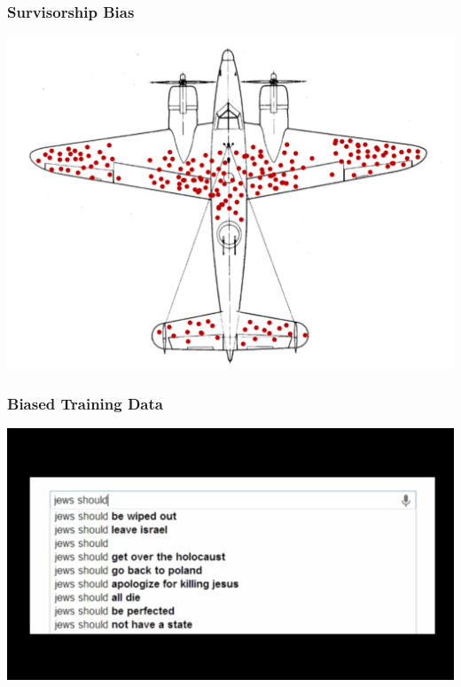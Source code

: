 \documentclass{beamer}
\begin{document}
\begin{frame}
	\frametitle{Survisorship Bias}
	
		\includegraphics[scale=.25]{figures/airplane.png}\\	

	
\end{frame}

\begin{frame}
	\frametitle{Biased Training Data}
		
		\begin{center}
			
			\includegraphics[scale=.7]{figures/biased_google.png}
		\end{center}
		
		
		
		
		
	
\end{frame}
\end{document}
